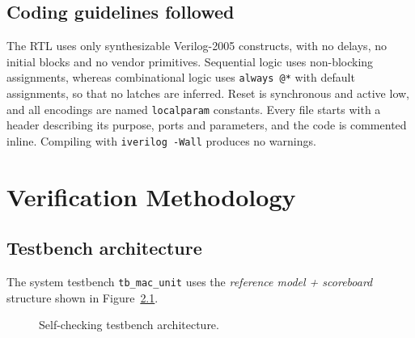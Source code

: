\documentclass[11pt,a4paper]{report}
\newcommand{\code}[1]{\texttt{#1}}
\begin{document}
\section{Coding guidelines followed}
The RTL uses only synthesizable Verilog-2005 constructs, with no delays, no
initial blocks and no vendor primitives. Sequential logic uses non-blocking
assignments, whereas combinational logic uses \code{always @*} with default
assignments, so that no latches are inferred. Reset is synchronous and active
low, and all encodings are named \code{localparam} constants. Every file starts
with a header describing its purpose, ports and parameters, and the code is
commented inline. Compiling with \code{iverilog -Wall} produces no warnings.



\chapter{Verification Methodology}\label{ch:verif}

\section{Testbench architecture}
The system testbench \code{tb\_mac\_unit} uses the
\emph{reference model + scoreboard} structure shown in
Figure~\ref{fig:tb}.

\begin{figure}[H]
  \centering
  \caption{Self-checking testbench architecture.}
  \label{fig:tb}
\end{figure}
\end{document}

